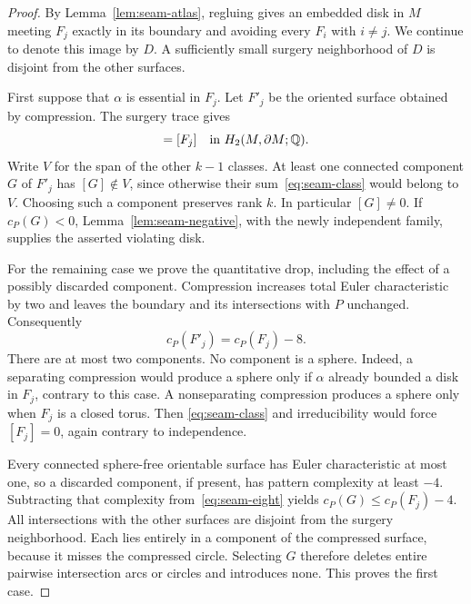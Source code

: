 \begin{proof}
By Lemma~\ref{lem:seam-atlas}, regluing gives an embedded disk in $M$
meeting $F_j$ exactly in its boundary and avoiding every $F_i$ with
$i\ne j$.  We continue to denote this image by $D$.  A sufficiently
small surgery neighborhood of $D$ is disjoint from the other surfaces.

First suppose that $\alpha$ is essential in $F_j$.  Let $F'_j$ be the
oriented surface obtained by compression.  The surgery trace gives
\begin{equation}
                   [F'_j]=[F_j]
                   \quad\hbox{in }H_2(M,\partial M;\mathbb Q).
                   \label{eq:seam-class}
\end{equation}
Write $V$ for the span of the other $k-1$ classes.  At least one
connected component $G$ of $F'_j$ has $[G]\notin V$, since otherwise
their sum~\eqref{eq:seam-class} would belong to $V$.  Choosing such a
component preserves rank $k$.  In particular $[G]\ne0$.  If
$c_P(G)<0$, Lemma~\ref{lem:seam-negative}, with the newly independent
family, supplies the asserted violating disk.

For the remaining case we prove the quantitative drop, including the
effect of a possibly discarded component.  Compression increases total
Euler characteristic by two and leaves the boundary and its intersections
with $P$ unchanged.  Consequently
\begin{equation}
                       c_P(F'_j)=c_P(F_j)-8.
                       \label{eq:seam-eight}
\end{equation}
There are at most two components.  No component is a sphere.  Indeed, a
separating compression would produce a sphere only if $\alpha$ already
bounded a disk in $F_j$, contrary to this case.  A nonseparating
compression produces a sphere only when $F_j$ is a closed torus.  Then
\eqref{eq:seam-class} and irreducibility would force $[F_j]=0$, again
contrary to independence.

Every connected sphere-free orientable surface has Euler characteristic
at most one, so a discarded component, if present, has pattern
complexity at least $-4$.  Subtracting that complexity
from~\eqref{eq:seam-eight} yields
$c_P(G)\le c_P(F_j)-4$.  All intersections with the other surfaces
are disjoint from the surgery neighborhood.  Each lies entirely in a
component of the compressed surface, because it misses the compressed
circle.  Selecting $G$ therefore deletes entire pairwise intersection
arcs or circles and introduces none.  This proves the first case.


\end{proof}
